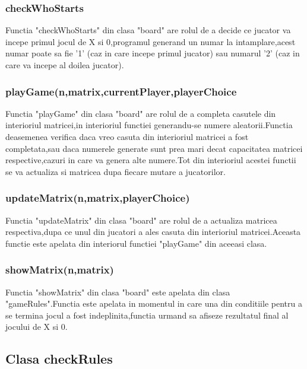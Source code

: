 \documentclass[12]{article}
\begin{document}
\subsubsection{checkWhoStarts}
\textcolor{white}{}

Functia "checkWhoStarts" din clasa "board" are rolul de a decide ce jucator va incepe primul jocul de X si 0,programul generand un numar la intamplare,acest numar poate sa fie '1' (caz in care incepe primul jucator) sau numarul '2' (caz in care va incepe al doilea jucator).

\subsubsection{playGame(n,matrix,currentPlayer,playerChoice}
\textcolor{white}{}

Functia "playGame" din clasa "board" are rolul de a completa casutele din interioriul matricei,in interioriul functiei generandu-se numere aleatorii.Functia deasemenea verifica daca vreo casuta din interioriul matricei a fost completata,sau daca numerele generate sunt prea mari decat capacitatea matricei respective,cazuri in care va genera alte numere.Tot din interioriul acestei functii se va actualiza si matricea dupa fiecare mutare a jucatorilor.

\subsubsection{updateMatrix(n,matrix,playerChoice)}
\textcolor{white}{}

Functia "updateMatrix" din clasa "board" are rolul de a actualiza matricea respectiva,dupa ce unul din jucatori a ales casuta din interioriul matricei.Aceasta functie este apelata din interiorul functiei "playGame" din aceeasi clasa.

\subsubsection{showMatrix(n,matrix)}
\textcolor{white}{}

Functia "showMatrix" din clasa "board" este apelata din clasa "gameRules".Functia este apelata in momentul in care una din conditiile pentru a se termina jocul a fost indeplinita,functia urmand sa afiseze rezultatul final al jocului de X si 0.

\subsection{Clasa checkRules}
\end{document}
